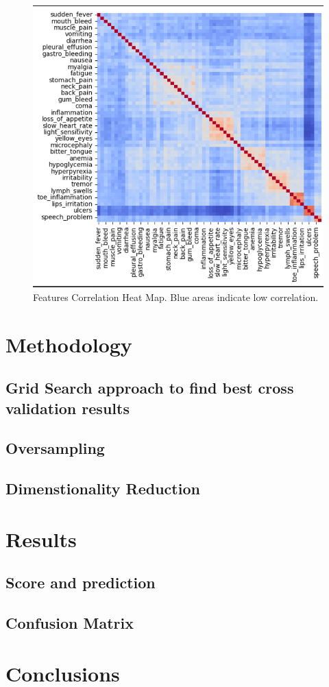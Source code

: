 \documentclass{article}
\begin{document}
\begin{figure}[h!]  
\centering
\includegraphics[width=1\linewidth]{CorrelationMatrix.png}
\caption{Features Correlation Heat Map. Blue areas indicate low correlation.}
\vspace{-1em} %
\end{figure}

\section{Methodology}
\subsection {Grid Search approach to find best cross validation results}


\subsection{Oversampling}

\subsection{Dimenstionality Reduction}

\section{Results}

\subsection{Score and prediction}

\subsection{Confusion Matrix}

\section{Conclusions}



\end{document}
